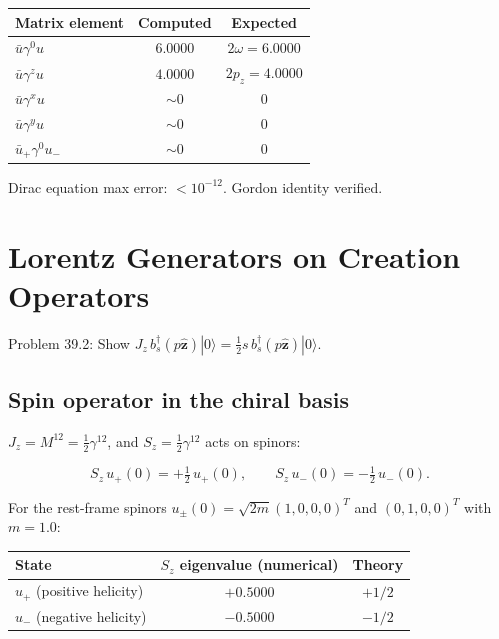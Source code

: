 \documentclass[12pt]{article}
\newcommand{\verified}[1]{\textcolor{verifygreen}{\checkmark\; #1}}
\begin{document}
\begin{center}
\begin{tabular}{l|c|c}
Matrix element & Computed & Expected \\ \hline
$\bar u\gamma^0 u$ & $6.0000$ & $2\omega=6.0000$ \\
$\bar u\gamma^z u$  & $4.0000$ & $2p_z=4.0000$ \\
$\bar u\gamma^x u$  & $\sim 0$ & $0$ \\
$\bar u\gamma^y u$  & $\sim 0$ & $0$ \\
$\bar u_+\gamma^0 u_-$ & $\sim 0$ & $0$ \\
\end{tabular}
\end{center}

\verified{Dirac equation max error: $<10^{-12}$. Gordon identity verified.}

\section{Lorentz Generators on Creation Operators}

Problem 39.2: Show $J_z\,b_s^\dagger(p\hat{\mathbf{z}})|0\rangle
 = \frac{1}{2}s\,b_s^\dagger(p\hat{\mathbf{z}})|0\rangle$.

\subsection{Spin operator in the chiral basis}

$J_z = M^{12} = \frac{1}{2}\gamma^{12}$, and $S_z = \frac{1}{2}\gamma^{12}$ acts on spinors:
\begin{mdframed}[backgroundcolor=blue!5]
\begin{equation}
S_z\,u_+(0) = +\tfrac{1}{2}\,u_+(0), \qquad
S_z\,u_-(0) = -\tfrac{1}{2}\,u_-(0) .
\end{equation}
\end{mdframed}

For the rest-frame spinors $u_\pm(0)=\sqrt{2m}(1,0,0,0)^T$ and $(0,1,0,0)^T$ with $m=1.0$:
\begin{center}
\begin{tabular}{l|c|c}
State & $S_z$ eigenvalue (numerical) & Theory \\ \hline
$u_+$ (positive helicity) & $+0.5000$ & $+1/2$ \\
$u_-$ (negative helicity) & $-0.5000$ & $-1/2$ \\
\end{tabular}
\end{center}
\end{document}
